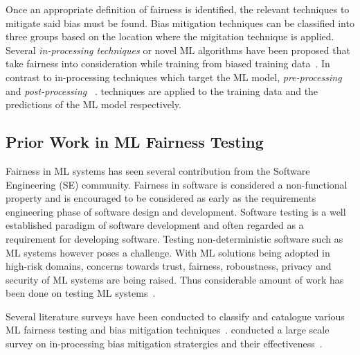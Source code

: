 \documentclass{article}
\begin{document}
Once an appropriate definition of fairness is identified, the relevant
techniques to mitigate said bias must be found. Bias mitigation
techniques can be classified into three groups based on the location
where the migitation technique is applied. Several \emph{in-processing
techniques} or novel ML algorithms have been proposed that take
fairness into consideration while training from biased training
data \cite{zhang2018mitigating,agarwal2018reductions,kearns2018preventing,kearns2019empirical,kamishima2012fairness}. In
contrast to in-processing techniques which target the ML model,
\emph{pre-processing}
 \cite{feldman2015certifying,zemel2013learning,calmon2017optimized,kamiran2012data}
and \emph{post-processing}
 \cite{pleiss2017fairness,hardt2016equality,kamiran2012decision}. techniques
are applied to the training data and the predictions of the ML model
respectively.



\subsection{Prior Work in ML Fairness Testing}\label{sec:prior-work}

Fairness in ML systems has seen several contribution from the Software
Engineering (SE) community. Fairness in software is considered a
non-functional property and is encouraged to be considered as early as
the requirements engineering phase of software design and development.
Software testing is a well established paradigm of software
development and often regarded as a requirement for developing
software. Testing non-deterministic software such as ML systems
however poses a challenge. With ML solutions being adopted in
high-risk domains, concerns towards trust, fairness, roboustness,
privacy and security of ML systems are being raised. Thus considerable
amount of work has been done on testing ML
systems \cite{zhang2020machine}.

Several literature surveys have been conducted to classify and
catalogue various ML fairness testing and bias mitigation
techniques \cite{wan2021modeling,mehrabi2021survey,chen2022fairness}.
\citeauthor{wan2021modeling} conducted a large scale survey on
in-processing bias mitigation stratergies and their
effectiveness \cite{wan2021modeling}.
\end{document}
